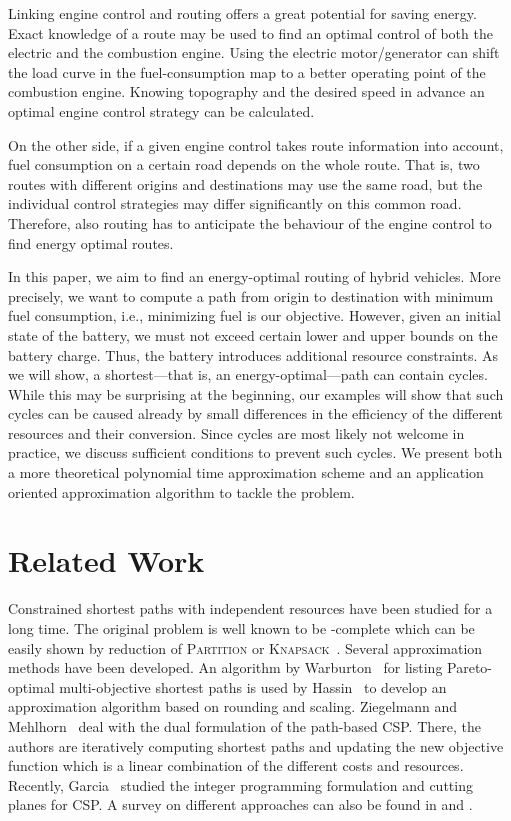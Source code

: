 \documentclass[a4paper]{scrartcl}
\begin{document}
Linking engine control and routing offers a great potential for saving energy. Exact knowledge of a route may be used to find an optimal control of both the electric and the combustion engine. Using the electric motor/generator can shift the load curve in the fuel-consumption map to a better operating point of the combustion engine. Knowing topography and the desired speed in advance an optimal engine control strategy can be calculated.  

On the other side, if a given engine control takes route information into account, fuel consumption on a certain road depends on the whole route. That is, two routes with different origins and destinations may use the same road, but the individual control strategies may differ significantly on this common road. Therefore, also routing has to anticipate the behaviour of the engine control to find energy optimal routes.


In this paper, we aim to find an energy-optimal routing of hybrid vehicles. More precisely, we want to compute a path from origin to destination with minimum fuel consumption, i.e., minimizing fuel is our objective. However, given an initial state of the battery, we must not exceed certain lower and upper bounds on the battery charge. Thus, the battery introduces additional resource constraints. As we will show, a shortest---that is, an energy-optimal---path can contain cycles. While this may be surprising at the beginning, our examples will show that such cycles can be caused already by small differences in the efficiency of the different resources and their conversion. Since cycles are most likely not welcome in practice, we discuss sufficient conditions to prevent such cycles. We present both a more theoretical polynomial time approximation scheme and an application oriented approximation algorithm to tackle the problem. 

\section{Related Work}

Constrained shortest paths with independent resources have been studied for a long time. The original problem is well known to be -complete which can be easily shown by reduction of \textsc{Partition} or \textsc{Knapsack}~\cite{Johnson_complexity}. Several approximation methods have been developed.  An algorithm by Warburton~\cite{war87} for listing Pareto-optimal multi-objective shortest paths is used by Hassin~\cite{Hassin} to develop an approximation algorithm based on rounding and scaling. Ziegelmann and Mehlhorn~\cite{Ziegelmann+Mehlhorn_CSP, Ziegelmann_CSP} deal with the dual formulation of the path-based CSP. There, the authors are iteratively computing shortest paths and updating the new objective function which is a linear combination of the different costs and resources. Recently, Garcia~\cite{Garcia_CSP} studied the integer programming formulation and cutting planes for CSP. A survey on different approaches can also be found in \cite{Garcia_CSP} and \cite{Ziegelmann_CSP}.
\end{document}
